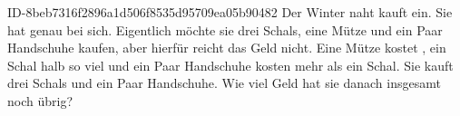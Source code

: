 \begin{exercise}
      {ID-8beb7316f2896a1d506f8535d95709ea05b90482}
      {Der Winter naht}
  \ifproblem\problem
    \xxa{} kauft ein. Sie hat genau  bei sich. Eigentlich möchte sie
    drei Schals, eine Mütze und ein Paar Handschuhe kaufen, aber hierfür
    reicht das Geld nicht. Eine Mütze kostet , ein Schal halb so
    viel und ein Paar Handschuhe kosten  mehr als ein Schal. Sie kauft
    drei Schals und ein Paar Handschuhe. Wie viel Geld hat sie danach insgesamt
    noch übrig?
  \fi
\end{exercise}
